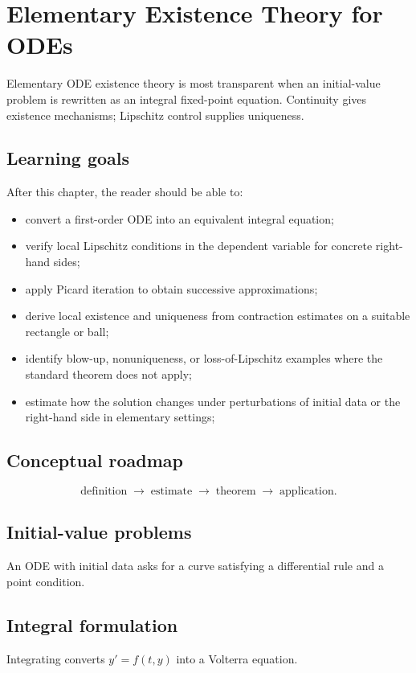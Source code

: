\chapter{Elementary Existence Theory for ODEs}
\label{ch:ii19}

Elementary ODE existence theory is most transparent when an initial-value problem is rewritten as an integral fixed-point equation. Continuity gives existence mechanisms; Lipschitz control supplies uniqueness.

\section*{Learning goals}
After this chapter, the reader should be able to:
\begin{itemize}
\item convert a first-order ODE into an equivalent integral equation;
\item verify local Lipschitz conditions in the dependent variable for concrete right-hand sides;
\item apply Picard iteration to obtain successive approximations;
\item derive local existence and uniqueness from contraction estimates on a suitable rectangle or ball;
\item identify blow-up, nonuniqueness, or loss-of-Lipschitz examples where the standard theorem does not apply;
\item estimate how the solution changes under perturbations of initial data or the right-hand side in elementary settings;
\end{itemize}
\section*{Conceptual roadmap}
\[
\boxed{\text{definition}\;\longrightarrow\;\text{estimate}\;\longrightarrow\;\text{theorem}\;\longrightarrow\;\text{application}.}
\]

\section{Initial-value problems}
An ODE with initial data asks for a curve satisfying a differential rule and a point condition.

\section{Integral formulation}
Integrating converts $y'=f(t,y)$ into a Volterra equation.

